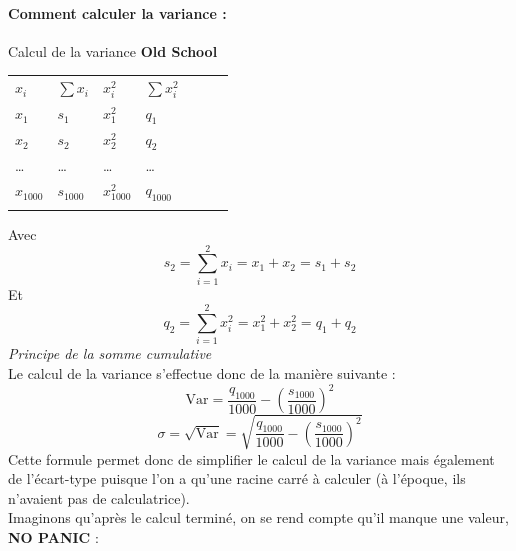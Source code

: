 \paragraph{Comment calculer la variance :}
Calcul de la variance \textbf{Old School}
\begin{center}

\begin{tabular}{lllllll}
\cline{1-4}
\multicolumn{1}{|l|}{$x_{i}$} & \multicolumn{1}{l|}{$\sum x_{i}$} & \multicolumn{1}{l|}{$x_{i}^{2}$} & \multicolumn{1}{l|}{$\sum x_{i}^{2}$} &  &  &  \\ \cline{1-4}
$x_{1}$                       & $s_{1}$                           & $x_{1}^{2}$                      & $q_{1}$                               &  &  &  \\
$x_{2}$                       & $s_{2}$                           & $x_{2}^{2}$                      & $q_{2}$                               &  &  &  \\
\dots                         & \dots                             & \dots                            & \dots                                 &  &  &  \\
$x_{1000}$                    & $s_{1000}$                        & $x_{1000}^{2}$                   & $q_{1000}$                            &  &  &  \\
                              &                                   &                                  &                                       &  &  & 
\end{tabular}
\end{center}
Avec $$s_{2} = \sum_{i=1}^{2} x_{i} = x_{1} + x_{2}= s_{1}+s_{2} $$
Et $$q_{2} = \sum_{i=1}^{2} x_{i}^{2} = x_{1}^{2} + x_{2}^{2} = q_{1}+q_{2}$$
\textit{Principe de la somme cumulative}\newline
\\
Le calcul de la variance s'effectue donc de la manière suivante : 
$$\textrm{Var} = \frac{q_{1000}}{1000} - (\frac{s_{1000}}{1000})^{2}$$
$$\sigma = \sqrt{\textrm{Var}} = \sqrt{\frac{q_{1000}}{1000} - (\frac{s_{1000}}{1000})^{2}}$$
Cette formule permet donc de simplifier le calcul de la variance mais également de l'écart-type puisque l'on a qu'une racine carré à calculer (à l'époque, ils n'avaient pas de calculatrice).\newline
\\ 
Imaginons qu'après le calcul terminé, on se rend compte qu'il manque une valeur, \textbf{NO PANIC} : 

